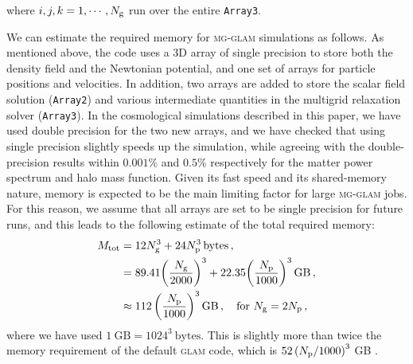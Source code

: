 where $i,j,k=1,\cdots,N_{\rm g}$ run over the entire \texttt{Array3}. 


We can estimate the required memory for \textsc{mg-glam} simulations as follows. As mentioned above, the code uses a 3D array of single precision to store both the density field and the Newtonian potential, and one set of arrays for particle positions and velocities. In addition, two arrays are added %
to store the scalar field solution (\texttt{Array2}) and various intermediate quantities in the multigrid relaxation solver (\texttt{Array3}). In the cosmological simulations described in this paper, we have used double precision for the two new arrays, and we have checked that using single precision slightly speeds up the simulation, while agreeing with the double-precision results within $0.001\%$ and $0.5\%$ respectively for the matter power spectrum and halo mass function. Given its fast speed and its shared-memory nature, memory is expected to be the main limiting factor for large \textsc{mg-glam} jobs. For this reason, we assume that all arrays are set to be single precision for future runs, and this leads to the following estimate of the total required memory:
\begin{align}
M_{\rm tot} &= 12N^3_{\rm g} + 24N^3_{\rm p} \, {\rm bytes}\,,\nonumber\\
&= 89.41 \qty(\frac{N_{\rm g}}{2000})^3 + 22.35\qty(\frac{N_{\rm p}}{1000})^3 \, {\rm GB}\,,\nonumber\\
&\approx 112 \, \qty(\frac{N_{\rm p}}{1000})^3 \, {\rm GB}\,,\quad {\rm for} \  N_{\rm g}=2N_{\rm p}\,,
\end{align}
where we have used $1~\mathrm{GB} = 1024^3~\mathrm{bytes}$. This is slightly more than twice the memory requirement of the default \textsc{glam} code, which is $52\left(N_{\rm p}/1000\right)^3$ GB \citep{Klypin:2017iwu}.



















